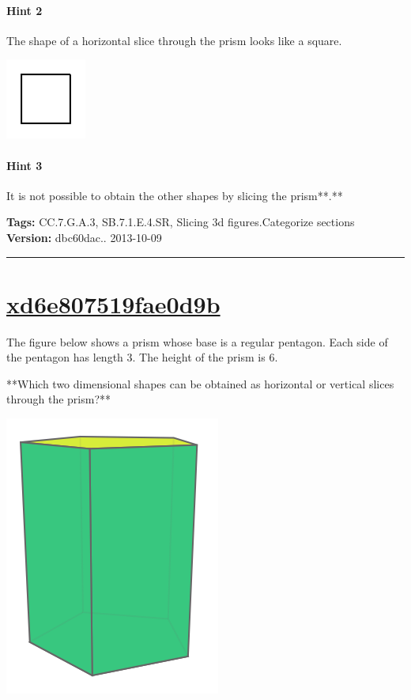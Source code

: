 \documentclass[twocolumn,10pt]{article}
\def\shrinkfactor{0.4}
\begin{document}
\paragraph{Hint 2}The shape of a horizontal slice through the prism looks like a square.  

\includegraphics[scale=\shrinkfactor]{figures/4b59a0ece6acc7c19c389e1de534d1df93bf1169.png}

\paragraph{Hint 3}It is not possible to obtain the other shapes by slicing the prism**.**



\medskip
\noindent
\textbf{Tags:} {\footnotesize CC.7.G.A.3, SB.7.1.E.4.SR, Slicing 3d figures.Categorize sections}\\
\textbf{Version:} dbc60dac.. 2013-10-09
\smallskip\hrule





\section{\href{https://www.khanacademy.org/devadmin/content/items/xd6e807519fae0d9b}{xd6e807519fae0d9b}}

\noindent
The figure below shows a prism whose base is a regular pentagon. Each side of the pentagon has length $3$. The height of the prism is $6$. 

**Which two dimensional shapes can be obtained as  horizontal or vertical slices through the prism?**  


\includegraphics[scale=\shrinkfactor]{figures/5ada81db609c40821a80a0afea3b253e67a1b203.png}
\end{document}
